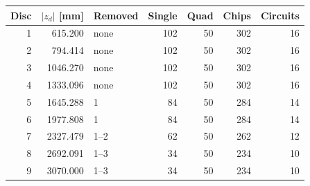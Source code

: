 \begin{tabular}{r r l r r r r}
\toprule
Disc & $|z_d|$ [mm] & Removed & Single & Quad & Chips & Circuits\\
\midrule
1 & \num{615.200} & none & 102 & 50 & 302 & 16 \\
2 & \num{794.414} & none & 102 & 50 & 302 & 16 \\
3 & \num{1046.270} & none & 102 & 50 & 302 & 16 \\
4 & \num{1333.096} & none & 102 & 50 & 302 & 16 \\
5 & \num{1645.288} & 1 & 84 & 50 & 284 & 14 \\
6 & \num{1977.808} & 1 & 84 & 50 & 284 & 14 \\
7 & \num{2327.479} & 1--2 & 62 & 50 & 262 & 12 \\
8 & \num{2692.091} & 1--3 & 34 & 50 & 234 & 10 \\
9 & \num{3070.000} & 1--3 & 34 & 50 & 234 & 10 \\
\bottomrule
\end{tabular}
